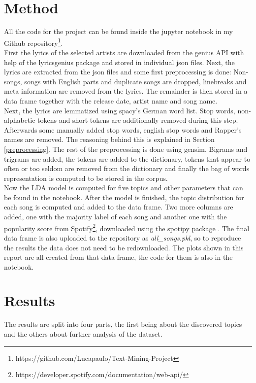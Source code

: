 \documentclass[conference]{IEEEtran}
\begin{document}
\section{Method}
All the code for the project can be found inside the jupyter notebook in my Github repository\footnote{https://github.com/Lucapaulo/Text-Mining-Project}.\\
First the lyrics of the selected artists are downloaded from the genius API with help of the lyricsgenius package \cite{lyricsgenius} and stored in individual json files. Next, the lyrics are extracted from the json files and some first preprocessing is done: Non-songs, songs with English parts and duplicate songs are dropped, linebreaks and meta information are removed from the lyrics. The remainder is then stored in a data frame together with the release date, artist name and song name.\\
Next, the lyrics are lemmatized using spacy's German word list. Stop words, non-alphabetic tokens and short tokens are additionally removed during this step. Afterwards some manually added stop words, english stop words and Rapper's names are removed. The reasoning behind this is explained in Section \ref{preprocessing}. The rest of the preprocessing is done using gensim. Bigrams and trigrams are added, the tokens are added to the dictionary, tokens that appear to often or too seldom are removed from the dictionary and finally the bag of words representation is computed to be stored in the corpus.\\
Now the LDA model is computed for five topics and other parameters that can be found in the notebook. After the model is finished, the topic distribution for each song is computed and added to the data frame. Two more columns are added, one with the majority label of each song and another one with the popularity score from Spotify\footnote{https://developer.spotify.com/documentation/web-api/}, downloaded using the spotipy package \cite{spotipy}. The final data frame is also uploaded to the repository as \textit{all\_songs.pkl}, so to reproduce the results the data does not need to be redownloaded. The plots shown in this report are all created from that data frame, the code for them is also in the notebook.

\section{Results} \label{results}
The results are split into four parts, the first being about the discovered topics and the others about further analysis of the dataset.
\end{document}
